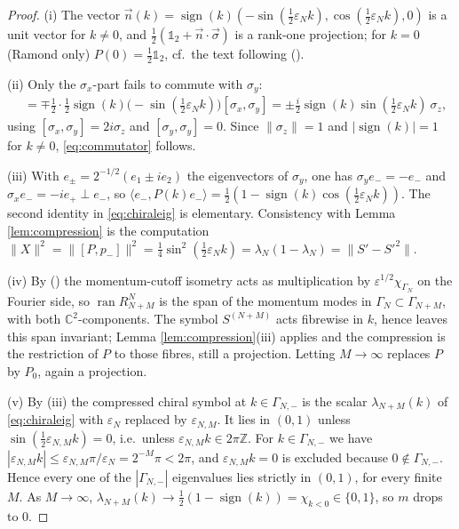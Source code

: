 \documentclass[11pt,a4paper]{article}
\theoremstyle{definition}
\newcommand{\vep}{\varepsilon}
\newcommand{\1}{\mathds{1}}
\newcommand{\sign}{\operatorname{sign}}
\newcommand{\ran}{\operatorname{ran}}
\newcommand{\C}{\mathbb{C}}
\newcommand{\Z}{\mathbb{Z}}
\newcommand{\Gam}{\Gamma}
\begin{document}
\begin{proof}
(i) The vector $\vec{n}(k)=\sign(k)(-\sin(\tfrac{1}{2}\vep_{N}k),\cos(\tfrac{1}{2}\vep_{N}k),0)$ is a
unit vector for $k\neq0$, and $\tfrac{1}{2}(\1_{2}+\vec{n}\cdot\vec{\sigma})$ is a rank-one
projection; for $k=0$ (Ramond only) $P(0)=\tfrac{1}{2}\1_{2}$, cf.~the text following (\mrLatVac).

(ii) Only the $\sigma_{x}$-part fails to commute with $\sigma_{y}$:
\begin{align*}
[P(k),p_{\mp}] & = \mp\tfrac{1}{2}\cdot\tfrac{1}{2}\sign(k)\big(-\sin(\tfrac{1}{2}\vep_{N}k)\big)
 [\sigma_{x},\sigma_{y}] = \pm\tfrac{i}{2}\sign(k)\sin(\tfrac{1}{2}\vep_{N}k)\!\ \sigma_{z},
\end{align*}
using $[\sigma_{x},\sigma_{y}]=2i\sigma_{z}$ and $[\sigma_{y},\sigma_{y}]=0$. Since $\|\sigma_{z}\|=1$
and $|\sign(k)|=1$ for $k\neq0$, \eqref{eq:commutator} follows.

(iii) With $e_{\pm}=2^{-1/2}(e_{1}\pm ie_{2})$ the eigenvectors of $\sigma_{y}$, one has
$\sigma_{y}e_{-}=-e_{-}$ and $\sigma_{x}e_{-}=-ie_{+}\perp e_{-}$, so
$\langle e_{-},P(k)e_{-}\rangle=\tfrac{1}{2}(1-\sign(k)\cos(\tfrac{1}{2}\vep_{N}k))$. The second
identity in \eqref{eq:chiraleig} is elementary. Consistency with Lemma \ref{lem:compression} is the
computation $\|X\|^{2}=\|[P,p_{-}]\|^{2}=\tfrac{1}{4}\sin^{2}(\tfrac{1}{2}\vep_{N}k)
=\lambda_{N}(1-\lambda_{N})=\|S'-S'^{2}\|$.

(iv) By (\mrMomRG) the momentum-cutoff isometry acts as multiplication by
$\vep^{1/2}\chi_{\Gam_{N}}$ on the Fourier side, so $\ran R^{N}_{N+M}$ is the span of the momentum
modes in $\Gam_{N}\subset\Gam_{N+M}$, with both $\C^{2}$-components. The symbol $S^{(N+M)}$ acts
fibrewise in $k$, hence leaves this span invariant; Lemma \ref{lem:compression}(iii) applies and the
compression is the restriction of $P$ to those fibres, still a projection. Letting $M\rightarrow
\infty$ replaces $P$ by $P_{0}$, again a projection.

(v) By (iii) the compressed chiral symbol at $k\in\Gam_{N,-}$ is the scalar $\lambda_{N+M}(k)$ of
\eqref{eq:chiraleig} with $\vep_{N}$ replaced by $\vep_{N,M}$. It lies in $(0,1)$ unless
$\sin(\tfrac{1}{2}\vep_{N,M}k)=0$, i.e.~unless $\vep_{N,M}k\in2\pi\Z$. For $k\in\Gam_{N,-}$ we have
$|\vep_{N,M}k|\leq\vep_{N,M}\pi/\vep_{N}=2^{-M}\pi<2\pi$, and $\vep_{N,M}k=0$ is excluded because
$0\notin\Gam_{N,-}$. Hence every one of the $|\Gam_{N,-}|$ eigenvalues lies strictly in $(0,1)$,
for every finite $M$. As $M\rightarrow\infty$, $\lambda_{N+M}(k)\rightarrow
\tfrac{1}{2}(1-\sign(k))=\chi_{k<0}\in\{0,1\}$, so $m$ drops to $0$.


\end{proof}
\end{document}
